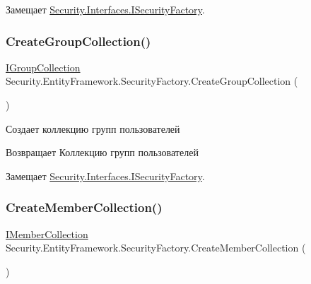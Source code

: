 Замещает \hyperlink{interface_security_1_1_interfaces_1_1_i_security_factory_aaf6f0d74a597fc683462caa7900c363b}{Security.\+Interfaces.\+I\+Security\+Factory}.

\mbox{\label{class_security_1_1_entity_framework_1_1_security_factory_ad08ab6dc0f55eba7bc8adfc3a982ae1b}} 
\subsubsection{\texorpdfstring{Create\+Group\+Collection()}{CreateGroupCollection()}}
{\footnotesize\ttfamily \hyperlink{interface_security_1_1_interfaces_1_1_collections_1_1_i_group_collection}{I\+Group\+Collection} Security.\+Entity\+Framework.\+Security\+Factory.\+Create\+Group\+Collection (\begin{DoxyParamCaption}{ }\end{DoxyParamCaption})}



Создает коллекцию групп пользователей 

\begin{DoxyReturn}{Возвращает}
Коллекцию групп пользователей
\end{DoxyReturn}


Замещает \hyperlink{interface_security_1_1_interfaces_1_1_i_security_factory_a40b900dd3f5097db8ac77610cbc54e58}{Security.\+Interfaces.\+I\+Security\+Factory}.

\mbox{\label{class_security_1_1_entity_framework_1_1_security_factory_a46e859ae40869883722f3475a35f6eeb}} 
\subsubsection{\texorpdfstring{Create\+Member\+Collection()}{CreateMemberCollection()}}
{\footnotesize\ttfamily \hyperlink{interface_security_1_1_interfaces_1_1_collections_1_1_i_member_collection}{I\+Member\+Collection} Security.\+Entity\+Framework.\+Security\+Factory.\+Create\+Member\+Collection (\begin{DoxyParamCaption}{ }\end{DoxyParamCaption})}



